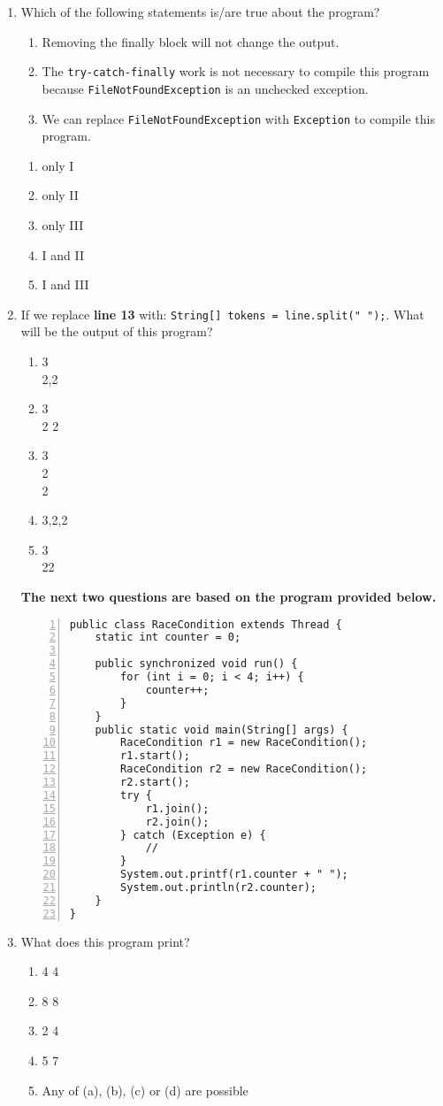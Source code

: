 \documentclass[CS180-S16-FinalExam.tex]{subfiles}
\begin{document}
\begin{enumerate}
\item Which of the following statements is/are true about the program?
\begin{enumerate}[I]
\item Removing the finally block will not change the output.
\item The \texttt{try-catch-finally} work is not necessary to compile this program because \texttt{FileNotFoundException} is an unchecked exception.
\item We can replace \texttt{FileNotFoundException} with \texttt{Exception} to compile this program. 
\end{enumerate}
\begin{enumerate}
\item only I
\item only II
\item only III
\item I and II
\item I and III \ifdraft \Ans \fi 
\end{enumerate}

\item If we replace \textbf{line 13} with: \texttt{String[] tokens = line.split(" ");}. What will be the output of this program? 
\begin{enumerate}
\item 3\\2,2\ifdraft \Ans \fi 
\item 3\\2 2
\item 3\\2\\2
\item 3,2,2
\item 3\\22
\end{enumerate}
\clearpage
\textbf{The next two questions are based on the program provided below.}
\begin{lstlisting}[numbers=left]
public class RaceCondition extends Thread {
	static int counter = 0;
    
	public synchronized void run() {
		for (int i = 0; i < 4; i++) {
			counter++;
		}
	}
	public static void main(String[] args) {
		RaceCondition r1 = new RaceCondition();
		r1.start();
		RaceCondition r2 = new RaceCondition();
		r2.start();
		try {
			r1.join();
			r2.join();
		} catch (Exception e) {
        	//
		}
		System.out.printf(r1.counter + " ");
		System.out.println(r2.counter);
	}
}
\end{lstlisting}
\item What does this program print?
\begin{enumerate}
\item 4 4
\item 8 8 \ifdraft \Ans \fi 
\item 2 4
\item 5 7
\item Any of (a), (b), (c) or (d) are possible
\end{enumerate}


\end{enumerate}
\end{document}
